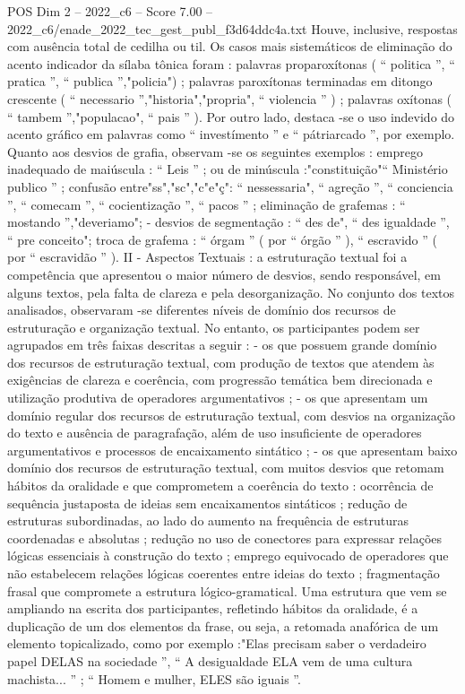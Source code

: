 \begin{textsample}{POS Dim 2 – 2022\_c6 – Score 7.00 – 2022\_c6/enade\_2022\_tec\_gest\_publ\_f3d64ddc4a.txt}
Houve, inclusive, respostas com ausência total de cedilha ou til.
Os casos mais sistemáticos de eliminação do acento indicador da sílaba tônica foram : palavras proparoxítonas ( “ politica ”, “ pratica ”, “ publica ”,"policia") ; palavras paroxítonas terminadas em ditongo crescente ( “ necessario ”,"historia","propria", “ violencia ” ) ; palavras oxítonas ( “ tambem ”,"populacao", “ pais ” ).
Por outro lado, destaca -se o uso indevido do acento gráfico em palavras como “ investímento ” e “ pátriarcado ”, por exemplo.
Quanto aos desvios de grafia, observam -se os seguintes exemplos : emprego inadequado de maiúscula : “ Leis ” ; ou de minúscula :"constituição"“ Ministério publico ” ; confusão entre"ss","sc","c"e"ç": “ nessessaria", “ agreção ”, “ conciencia ”, “ comecam ”, “ cocientização ”, “ pacos ” ; eliminação de grafemas : “ mostando ”,"deveriamo"; - desvios de segmentação : “ des de", “ des igualdade ”, “ pre conceito"; troca de grafema : “ órgam ” ( por “ órgão ” ), “ escravido ” ( por “ escravidão ” ).
II - Aspectos Textuais : a estruturação textual foi a competência que apresentou o maior número de desvios, sendo responsável, em alguns textos, pela falta de clareza e pela desorganização.
No conjunto dos textos analisados, observaram -se diferentes níveis de domínio dos recursos de estruturação e organização textual.
No entanto, os participantes podem ser agrupados em três faixas descritas a seguir : - os que possuem grande domínio dos recursos de estruturação textual, com produção de textos que atendem às exigências de clareza e coerência, com progressão temática bem direcionada e utilização produtiva de operadores argumentativos ; - os que apresentam um domínio regular dos recursos de estruturação textual, com desvios na organização do texto e ausência de paragrafação, além de uso insuficiente de operadores argumentativos e processos de encaixamento sintático ; - os que apresentam baixo domínio dos recursos de estruturação textual, com muitos desvios que retomam hábitos da oralidade e que comprometem a coerência do texto : ocorrência de sequência justaposta de ideias sem encaixamentos sintáticos ; redução de estruturas subordinadas, ao lado do aumento na frequência de estruturas coordenadas e absolutas ; redução no uso de conectores para expressar relações lógicas essenciais à construção do texto ; emprego equivocado de operadores que não estabelecem relações lógicas coerentes entre ideias do texto ; fragmentação frasal que compromete a estrutura lógico-gramatical.
Uma estrutura que vem se ampliando na escrita dos participantes, refletindo hábitos da oralidade, é a duplicação de um dos elementos da frase, ou seja, a retomada anafórica de um elemento topicalizado, como por exemplo :"Elas precisam saber o verdadeiro papel DELAS na sociedade ”, “ A desigualdade ELA vem de uma cultura machista... ” ; “ Homem e mulher, ELES são iguais ”.

\end{textsample}
